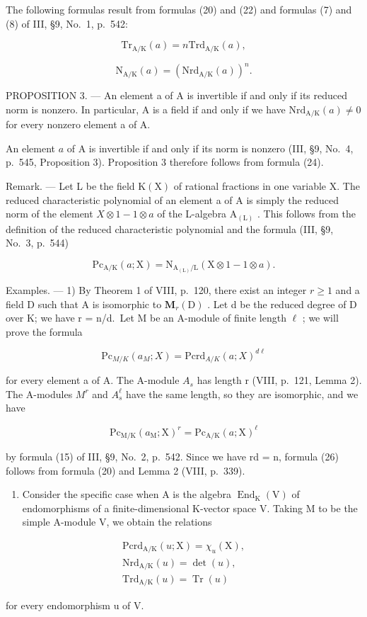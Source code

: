 The following formulas result from formulas (20) and (22) and formulas (7) and (8) of III, §9, No.~1, p.~542:

\[
\mathrm{Tr} _ {\mathrm{A/K}} (a) = n \mathrm{Trd} _ {\mathrm{A/K}} (a),\tag{23}
\]

\[
\mathrm{N} _ {\mathrm{A/K}} (a) = (\mathrm{Nrd} _ {\mathrm{A/K}} (a)) ^ {n}.\tag{24}
\]

PROPOSITION 3. --- An element a of A is invertible if and only if its reduced norm is nonzero. In particular, A is a field if and only if we have \(\mathrm{Nrd}_{\mathrm{A}/\mathrm{K}}(a) \neq 0\) for every nonzero element a of A.

An element \(a\) of A is invertible if and only if its norm is nonzero (III, §9, No.~4, p.~545, Proposition 3). Proposition 3 therefore follows from formula (24).

Remark. --- Let L be the field \(\mathrm{K}(\mathrm{X})\) of rational fractions in one variable X. The reduced characteristic polynomial of an element a of A is simply the reduced norm of the element \(X \otimes 1 - 1 \otimes a\) of the L-algebra \(\mathrm{A}_{(\mathrm{L})}\) . This follows from the definition of the reduced characteristic polynomial and the formula (III, §9, No.~3, p.~544)

\[
\mathrm{Pc} _ {\mathrm{A/K}} (a; \mathrm{X}) = \mathrm{N} _ {\mathrm{A} _ {(\mathrm{L})} / \mathrm{L}} (\mathrm{X} \otimes 1 - 1 \otimes a).\tag{25}
\]

Examples. --- 1) By Theorem 1 of VIII, p.~120, there exist an integer \(r \geqslant 1\) and a field D such that A is isomorphic to \(\mathbf{M}_{r}(\mathrm{D})\) . Let d be the reduced degree of D over K; we have r = n/d.~Let M be an A-module of finite length \(\ell\) ; we will prove the formula

\[
\mathrm{Pc} _ {M / K} (a_ {M} ;X) = \mathrm{Pcrd} _ {A / K} (a; X) ^ {d\ell}\tag{26}
\]

for every element a of A. The A-module \(A_{s}\) has length r (VIII, p.~121, Lemma 2). The A-modules \(M^{r}\) and \(A_{s}^{\ell}\) have the same length, so they are isomorphic, and we have

\[
\mathrm{Pc} _ {\mathrm{M/K}} (a _ {\mathrm{M}}; \mathrm{X}) ^ {r} = \mathrm{Pc} _ {\mathrm{A/K}} (a; \mathrm{X}) ^ {\ell}
\]

by formula (15) of III, §9, No.~2, p.~542. Since we have rd = n, formula (26) follows from formula (20) and Lemma 2 (VIII, p.~339).

\begin{enumerate}
\def\labelenumi{\arabic{enumi})}
\setcounter{enumi}{1}
\tightlist
\item
  Consider the specific case when A is the algebra \(\operatorname{End}_{\mathrm{K}}(\mathrm{V})\) of endomorphisms of a finite-dimensional K-vector space V. Taking M to be the simple A-module V, we obtain the relations
\end{enumerate}

\[
\begin{array}{c} \mathrm{Pcrd} _ {\mathrm{A/K}} (u; \mathrm{X}) = \chi_ {u} (\mathrm{X}), \\ \mathrm{Nrd} _ {\mathrm{A/K}} (u) = \det (u), \\ \mathrm{Trd} _ {\mathrm{A/K}} (u) = \operatorname{Tr} (u) \end{array}\tag{27}
\]

for every endomorphism u of V.

